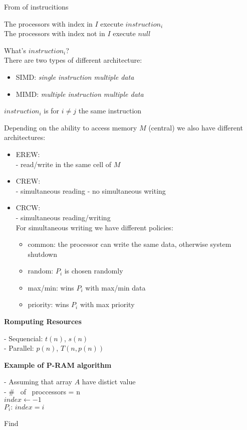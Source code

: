\begin{algorithm}[H]
 \SetAlgoLined
 \caption{From of instrucitions}
\end{algorithm}

The processors with index in $I$ execute $instruction_i$\\
The processors with index not in $I$ execute $null$

What's \textbf{$instruction_i$}?\\
There are two types of different architecture:
\begin{itemize}
 \item SIMD: \textit{single instruction multiple data}
 \item MIMD: \textit{multiple instruction multiple data}
\end{itemize}

$instruction_i$ is for $i \neq j$ the same instruction

Depending on the ability to access memory $M$ (central) we also have different architectures:
\begin{itemize}
 \item EREW:\\
 - read/write in the same cell of $M$
 \item CREW:\\
 - simultaneous reading
 - no simultaneous writing
 \item CRCW:\\
 - simultaneous reading/writing\\
 For simultaneous writing we have different policies:
 \begin{itemize}
  \item common: the processor can write the same data, otherwise system shutdown
  \item random: $P_i$ is chosen randomly
  \item max/min: wins $P_i$ with max/min data
  \item priority: wins $P_i$ with max priority
 \end{itemize}
\end{itemize}

\textbf{Romputing Resources}

- Sequencial: $t(n)$, $s(n)$\\
- Parallel: $p(n)$, $T(n, p(n))$

\textbf{Example of P-RAM algorithm}

\begin{algorithm}[H]
 - Assuming that array $A$ have distict value\\
 - \# \ of \ proccessors = n\\
 \SetAlgoLined
 $index \gets -1$\\
  {
  $P_i$:  {
   $index = i$
  } 
 }
 \caption{Find}
\end{algorithm}

